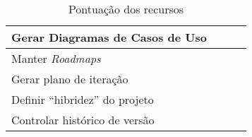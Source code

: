 \begin{table}[h]
\begin{tabular}{|p{3.5cm}|p{4cm}|p{4.5cm}|p{2cm}|}
Gerar Diagramas de Casos de Uso &
 &
 &
 \\ \hline
 
Manter \textit{Roadmaps} &
 &
 &
 \\ \hline
 
Gerar plano de iteração &
 &
 &
 \\ \hline
 
Definir ``hibridez'' do projeto &
 &
 &
 \\ \hline

Controlar histórico de versão &
 &
 &
 \\ \hline
\end{tabular}
\caption{Pontuação dos recursos}
\label{tab:pontuacao_recursos}
\end{table}